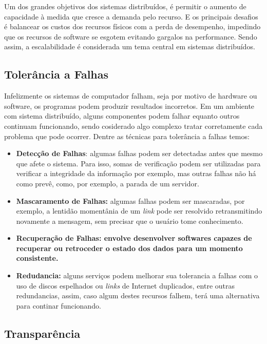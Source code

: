 \documentclass[
	12pt,				%
	oneside,			%
	a4paper,			%
	english,			%
	brazil				%
	]{abntex2ppgsi}
\begin{document}
Um dos grandes objetivos dos sistemas distribuídos, é permitir o aumento de capacidade à medida que cresce a demanda pelo recurso. E os principais desafios é balancear os custos dos recursos físicos com a perda de desempenho, impedindo que os recursos de software se esgotem evitando gargalos na performance. Sendo assim, a escalabilidade é considerada um tema central em sistemas distribuídos.

\subsection{Tolerância a Falhas}

Infelizmente os sistemas de computador falham, seja por motivo de hardware ou software, os programas podem produzir resultados incorretos. Em um ambiente com sistema distribuído, alguns componentes podem falhar equanto outros continuam funcionando, sendo cosiderado algo complexo tratar corretamente cada problema que pode ocorrer. Dentre as técnicas para tolerância a falhas temos: 

\begin{itemize}
	\item{\textbf{Detecção de Falhas}: algumas falhas podem ser detectadas antes que mesmo que afete o sistema. Para isso, somas de verificação podem ser utilizadas para verificar a integridade da informação por exemplo, mas outras falhas não há como prevê, como, por exemplo, a parada de um servidor.} 	
	\item{\textbf{Mascaramento de Falhas: } algumas falhas podem ser mascaradas, por exemplo, a lentidão momentânia de um \textit{link} pode ser resolvido retransmitindo novamente a mensagem, sem precisar que o usuário tome conhecimento.}
	\item{\textbf{Recuperação de Falhas: envolve desenvolver softwares capazes de recuperar ou retroceder o estado dos dados para um momento consistente.}}
	\item{\textbf{Redudancia:} alguns serviços podem melhorar sua tolerancia a falhas com o uso de discos espelhados ou \textit{links} de Internet duplicados, entre outras redundancias, assim, caso algum destes recursos falhem, terá uma alternativa para continar funcionando.}
\end{itemize} 

\subsection{Transparência}
\end{document}
